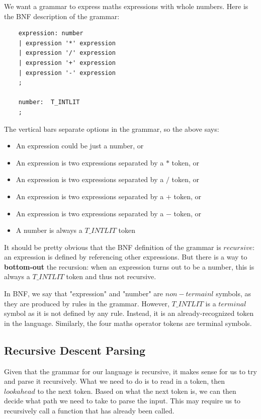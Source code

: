 \documentclass[journal, onecolumn, 12pt]{IEEEtran}
\begin{document}
We want a grammar to express maths expressions with whole numbers. Here is the BNF description of the grammar:

\begin{lstlisting}
    expression: number
    | expression '*' expression
    | expression '/' expression
    | expression '+' expression
    | expression '-' expression
    ;

    number:  T_INTLIT
    ;
\end{lstlisting}

The vertical bars separate options in the grammar, so the above says:

\begin{itemize}
    \item An expression could be just a number, or
    \item An expression is two expressions separated by a $*$ token, or
    \item An expression is two expressions separated by a $/$ token, or
    \item An expression is two expressions separated by a $+$ token, or
    \item An expression is two expressions separated by a $-$ token, or
    \item A number is always a $T\_INTLIT$ token
\end{itemize}

It should be pretty obvious that the BNF definition of the grammar is $recursive$: an expression is defined by referencing other expressions. But there is a way to \textbf{bottom-out} the recursion: when an expression turns out to be a number, this is always a $T\_INTLIT$ token and thus not recursive.

In BNF, we say that "expression" and "number" are $non-termainl$ symbols, as they are produced by rules in the grammar. However, $T\_INTLIT$ is a $terminal$ symbol as it is not defined by any rule. Instead, it is an already-recognized token in the language. Similarly, the four maths operator tokens are terminal symbols.

\subsection{Recursive Descent Parsing}

Given that the grammar for our language is recursive, it makes sense for us to try and parse it recursively. What we need to do is to read in a token, then $look ahead$ to the next token. Based on what the next token is, we can then decide what path we need to take to parse the input. This may require us to recursively call a function that has already been called.
\end{document}
